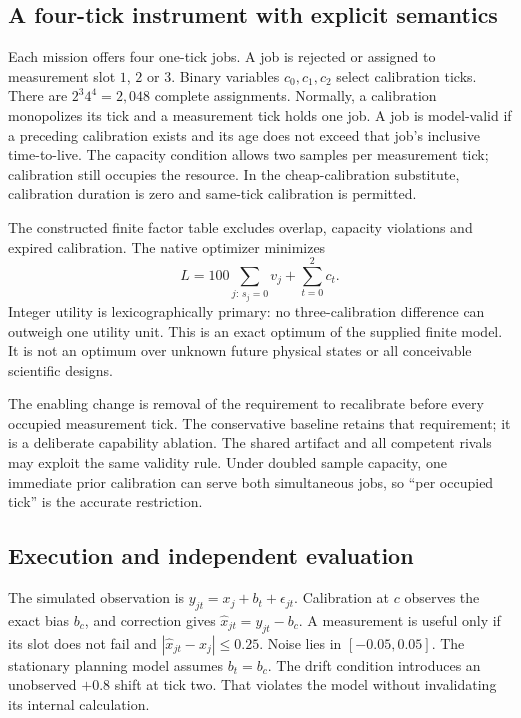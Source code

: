 \subsection{A four-tick instrument with explicit semantics}
Each mission offers four one-tick jobs. A job is rejected or assigned to measurement slot $1$, $2$ or $3$. Binary variables $c_0,c_1,c_2$ select calibration ticks. There are $2^3 4^4=2{,}048$ complete assignments. Normally, a calibration monopolizes its tick and a measurement tick holds one job. A job is model-valid if a preceding calibration exists and its age does not exceed that job's inclusive time-to-live. The capacity condition allows two samples per measurement tick; calibration still occupies the resource. In the cheap-calibration substitute, calibration duration is zero and same-tick calibration is permitted.

The constructed finite factor table excludes overlap, capacity violations and expired calibration. The native optimizer minimizes
\begin{equation}
L=100\sum_{j:\,s_j=0}v_j+\sum_{t=0}^{2}c_t.
\end{equation}
Integer utility is lexicographically primary: no three-calibration difference can outweigh one utility unit. This is an exact optimum of the supplied finite model. It is not an optimum over unknown future physical states or all conceivable scientific designs.

The enabling change is removal of the requirement to recalibrate before every occupied measurement tick. The conservative baseline retains that requirement; it is a deliberate capability ablation. The shared artifact and all competent rivals may exploit the same validity rule. Under doubled sample capacity, one immediate prior calibration can serve both simultaneous jobs, so ``per occupied tick'' is the accurate restriction.

\subsection{Execution and independent evaluation}
The simulated observation is $y_{jt}=x_j+b_t+\epsilon_{jt}$. Calibration at $c$ observes the exact bias $b_c$, and correction gives $\hat x_{jt}=y_{jt}-b_c$. A measurement is useful only if its slot does not fail and $|\hat x_{jt}-x_j|\leq0.25$. Noise lies in $[-0.05,0.05]$. The stationary planning model assumes $b_t=b_c$. The drift condition introduces an unobserved $+0.8$ shift at tick two. That violates the model without invalidating its internal calculation.

